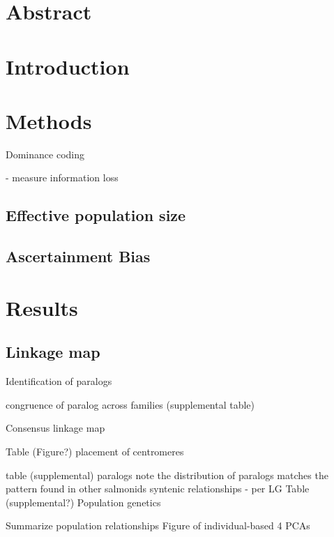 \documentclass[12pt,  one column]{article}
\begin{document}
\section*{Abstract}

\section*{Introduction}

\section*{Methods}

Dominance coding \cite{}

 - measure information loss
 
 
 


\subsection*{Effective population size}

\subsection*{Ascertainment Bias}

\section*{Results}

\subsection*{Linkage map}
Identification of paralogs

congruence of paralog across families (supplemental table)

Consensus linkage map

Table (Figure?)
placement of centromeres

table (supplemental)
paralogs
note the distribution of paralogs matches the  pattern found in other salmonids
syntenic relationships - per LG
Table (supplemental?)
Population genetics

Summarize population relationships
Figure of individual-based 4 PCAs
\end{document}
